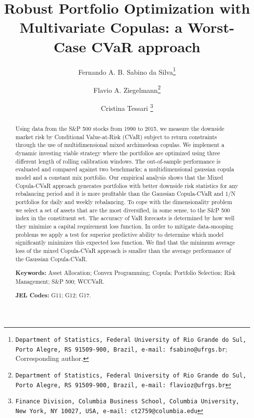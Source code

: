 \documentclass[a4paper,10pt]{article}
\begin{document}
\title{Robust Portfolio Optimization with Multivariate Copulas: a Worst-Case CVaR approach}
\author[]{ Fernando A. B. Sabino da Silva\thanks{\texttt{Department of Statistics, Federal University of Rio Grande do Sul, Porto Alegre, RS 91509-900, Brazil, e-mail: fsabino@ufrgs.br}; Corresponding author.}}
\author[]{Flavio A. Ziegelmann\thanks{\texttt{Department of Statistics, Federal University of Rio Grande do Sul, Porto Alegre, RS 91509-900, Brazil, e-mail: flavioz@ufrgs.br}}}
\author[]{Cristina Tessari \thanks{\texttt{Finance Division, Columbia Business School, Columbia University, New York, NY 10027, USA,
			e-mail: ct2759@columbia.edu}}}
\affil[]{}
\date{}
\maketitle

\begin{abstract}
Using data from the S\&P 500 stocks from 1990 to 2015, we measure the downside market risk by Conditional Value-at-Risk (CVaR) subject to return constraints through the use of multidimensional mixed archimedean copulas. We implement a dynamic investing viable strategy where the portfolios are optimized using three different length of rolling calibration windows. The out-of-sample performance is evaluated and compared against two benchmarks; a multidimensional gaussian copula model and a constant mix portfolio. Our empirical analysis shows that the Mixed Copula-CVaR approach generates portfolios with better downside risk statistics for any rebalancing period and it is more profitable than the Gaussian Copula-CVaR and 1/N portfolios for daily and weekly rebalancing. To cope with the dimensionality problem we select a set of assets that are the most diversified, in some sense, to the S\&P 500 index in the constituent set. The accuracy of VaR forecasts is determined by how well they minimize a capital requirement loss function. In order to mitigate data-snooping problems we apply a test for superior predictive ability to determine which model significantly minimizes this expected loss function. We find that the minimum average loss of the mixed Copula-CVaR approach is smaller than the average performance of the Gaussian Copula-CVaR.


\smallskip

\smallskip

\noindent \textbf{Keywords:} Asset Allocation; Convex Programming; Copula; Portfolio
Selection; Risk Management; S\&P 500; WCCVaR.

\noindent \textbf{JEL Codes:} G11; G12; G17.
\end{abstract}
\end{document}
